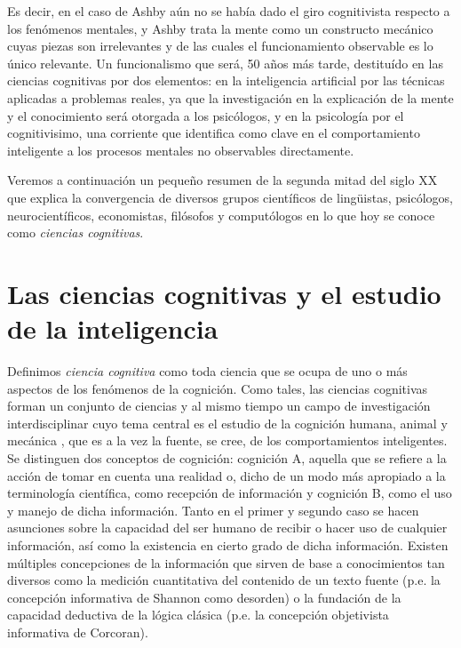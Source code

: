\documentclass[12pt]{memoir}
\begin{document}
Es decir, en el caso de Ashby aún no se había dado el giro cognitivista respecto a los fenómenos mentales, y Ashby trata la mente como un constructo mecánico cuyas piezas son irrelevantes y de las cuales el funcionamiento observable es lo único relevante. Un funcionalismo que será, 50 años más tarde, destituído en las ciencias cognitivas por dos elementos: en la inteligencia artificial por las técnicas aplicadas a problemas reales, ya que la investigación en la explicación de la mente y el conocimiento será otorgada a los psicólogos, y en la psicología por el cognitivisimo, una corriente que identifica como clave en el comportamiento inteligente a los procesos mentales no observables directamente. 

Veremos a continuación un pequeño resumen de la segunda mitad del siglo XX que explica la convergencia de diversos grupos científicos de lingüistas, psicólogos, neurocientíficos, economistas, filósofos y computólogos en lo que hoy se conoce como \textit{ciencias cognitivas}.

\section{Las ciencias cognitivas y el estudio de la inteligencia}

Definimos \textit{ciencia cognitiva} como toda ciencia que se ocupa de uno o más aspectos de los fenómenos de la cognición. Como tales, las ciencias cognitivas forman un conjunto de ciencias y al mismo tiempo un campo de investigación interdisciplinar cuyo tema central es el estudio de la cognición humana, animal y mecánica \parencite[p.20]{pmf07}, que es a la vez la fuente, se cree, de los comportamientos inteligentes. Se distinguen dos conceptos de cognición: cognición A, aquella que se refiere a la acción de tomar en cuenta una realidad o, dicho de un modo más apropiado a la terminología científica, como recepción de información y cognición B, como el uso y manejo de dicha información. Tanto en el primer y segundo caso se hacen asunciones sobre la capacidad del ser humano de recibir o hacer uso de cualquier información, así como la existencia en cierto grado de dicha información. Existen múltiples concepciones de la información que sirven de base a conocimientos tan diversos como la medición cuantitativa del contenido de un texto fuente (p.e. la concepción informativa de Shannon como desorden) o la fundación de la capacidad deductiva de la
lógica clásica (p.e. la concepción objetivista informativa de Corcoran).
\end{document}
